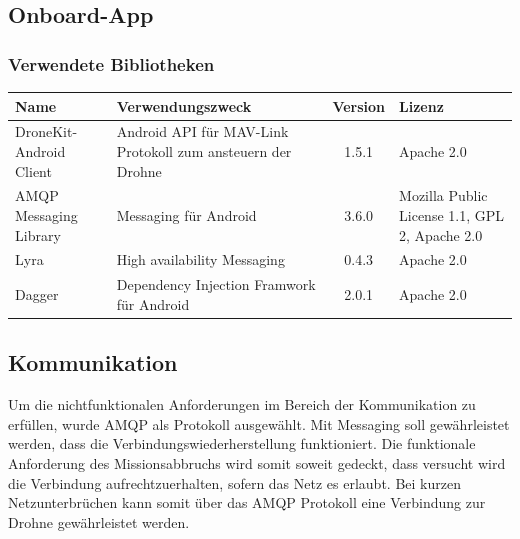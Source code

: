 \subsection{Onboard-App}

\subsubsection{Verwendete Bibliotheken}
\begin{tabularx}{\textwidth}{|X|X|c|X|}
	\hline
	\textbf{Name} & \textbf{Verwendungszweck} & \textbf{Version} & \textbf{Lizenz} \\
	\hline \hline
	DroneKit-Android Client & Android API für MAV-Link Protokoll zum ansteuern der Drohne & 1.5.1 & Apache 2.0\\
	\hline 
	AMQP Messaging Library & Messaging für Android & 3.6.0 &  Mozilla Public License 1.1, GPL 2,  Apache 2.0 \\
	\hline 
	Lyra  & High availability Messaging & 0.4.3 &  Apache 2.0 \\
	\hline 
	Dagger  & Dependency Injection Framwork für Android & 2.0.1 &  Apache 2.0 \\
	\hline 
\end{tabularx}

\subsection{Kommunikation}
Um die nichtfunktionalen Anforderungen im Bereich der Kommunikation zu erfüllen, wurde AMQP als Protokoll ausgewählt. Mit Messaging soll gewährleistet werden, dass die Verbindungswiederherstellung funktioniert. Die funktionale Anforderung des Missionsabbruchs wird somit soweit gedeckt, dass versucht wird die Verbindung aufrechtzuerhalten, sofern das Netz es erlaubt. Bei kurzen Netzunterbrüchen kann somit über das AMQP Protokoll eine Verbindung zur Drohne gewährleistet werden.

